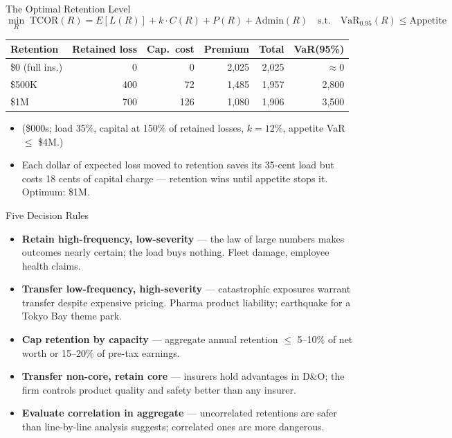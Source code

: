 \documentclass[11pt, aspectratio=169]{beamer}
\begin{document}
\begin{frame}{The Optimal Retention Level}
\[
\min_{R} \; \text{TCOR}(R) = E[L(R)] + k \cdot C(R) + P(R) + \text{Admin}(R)
\quad \text{s.t.} \quad \text{VaR}_{0.95}(R) \le \text{Appetite}
\]
\medskip
\begin{center}\small
\begin{tabular}{@{}lrrrrr@{}}
\toprule
\textbf{Retention} & \textbf{Retained loss} & \textbf{Cap.\ cost} & \textbf{Premium} & \textbf{Total} & \textbf{VaR(95\%)} \\
\midrule
\$0 (full ins.) & 0 & 0 & 2{,}025 & 2{,}025 & $\approx 0$ \\
\$500K & 400 & 72 & 1{,}485 & 1{,}957 & 2{,}800 \\
\$1M & 700 & 126 & 1{,}080 & 1{,}906 & 3{,}500 \\
\bottomrule
\end{tabular}
\end{center}
\medskip
\begin{itemize}
  \item (\$000s; load 35\%, capital at 150\% of retained losses, $k = 12\%$, appetite VaR $\le$ \$4M.)
  \item Each dollar of expected loss moved to retention saves its 35-cent load but costs 18 cents of capital charge --- retention wins until \alert{appetite stops it}. Optimum: \$1M.
\end{itemize}
\end{frame}

\begin{frame}{Five Decision Rules}
\begin{itemize}
  \item \textbf{Retain high-frequency, low-severity} --- the law of large numbers makes outcomes nearly certain; the load buys nothing. Fleet damage, employee health claims.
  \item \textbf{Transfer low-frequency, high-severity} --- catastrophic exposures warrant transfer despite expensive pricing. Pharma product liability; \alert{earthquake for a Tokyo Bay theme park}.
  \item \textbf{Cap retention by capacity} --- aggregate annual retention $\le$ 5--10\% of net worth or 15--20\% of pre-tax earnings.
  \item \textbf{Transfer non-core, retain core} --- insurers hold advantages in D\&O; the firm controls product quality and safety better than any insurer.
  \item \textbf{Evaluate correlation in aggregate} --- uncorrelated retentions are safer than line-by-line analysis suggests; correlated ones are more dangerous.
\end{itemize}
\end{frame}
\end{document}
